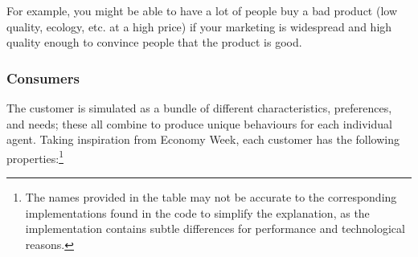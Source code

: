 For example, you might be able to have a lot of people buy a bad product (low quality, ecology, etc. at a high price) if
your marketing is widespread and high quality enough to convince people that the product is good.

\subsubsection{Consumers}

The customer is simulated as a bundle of different characteristics, preferences,
and needs; these all combine to produce unique behaviours for each individual
agent. Taking inspiration from Economy Week, each customer has the following
properties:\footnote{The names provided in the table may not be accurate to the
	corresponding implementations found in the code to simplify the explanation,
	as the implementation contains subtle differences for performance and
	technological reasons.
}

